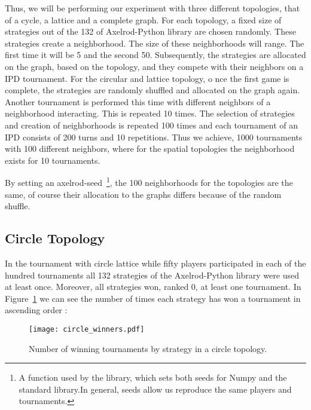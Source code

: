 Thus, we will be performing our experiment with three different topologies, that
of a cycle, a lattice and a complete graph.
For each topology, a fixed size of strategies out of the 132 of Axelrod-Python
library are chosen randomly. These strategies create a neighborhood.
The size of these neighborhoods will range. The first time it will be 5 and
the second 50. Subsequently, the strategies are allocated on the graph, based
on the topology, and they compete with their neighbors on a IPD tournament.
For the circular and lattice topology, o nce the first game is complete,
the strategies are randomly shuffled and allocated on the graph again.
Another tournament is performed this time with different neighbors of a
neighborhood interacting. This is repeated 10 times.
The selection of strategies and creation of neighborhoods is repeated 100 times
and each tournament of an IPD consists of 200 turns and 10 repetitions.
Thus we achieve, 1000 tournaments with 100 different neighbors, where for the
spatial topologies the neighborhood exists for 10 tournaments.

By setting an axelrod-seed~\footnote{A function used by the library, which sets
both seeds for Numpy and the standard library.In general, seeds allow us
reproduce the same players and tournaments.}, the 100 neighborhoods for the topologies
are the same, of course their allocation to the graphs differs because of the
random shuffle.

\subsection{Circle Topology}
\label{sub:circle}

In the tournament with circle lattice while fifty players participated in each
of the hundred tournaments all 132 strategies of the Axelrod-Python library were
used at least once. Moreover, all strategies won, ranked 0, at least one
tournament. In Figure~\ref{fig:circle_winners}  we can see the number of times
each strategy has won a tournament in ascending order :

\begin{figure}[h!]
  \hspace*{-2cm}
    \texttt{[image: circle\_winners.pdf]}
    \caption{Number of winning tournaments by strategy in a circle topology.}
    \label{fig:circle_winners}
\end{figure}

